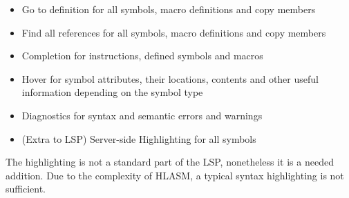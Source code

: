 \begin{itemize}
	\item Go to definition for all symbols, macro definitions and copy members
	\item Find all references for all symbols, macro definitions and copy members
	\item Completion for instructions, defined symbols and macros
	\item Hover for symbol attributes, their locations, contents and other useful information depending on the symbol type
	\item Diagnostics for syntax and semantic errors and warnings
	\item (Extra to LSP) Server-side Highlighting for all symbols  
\end{itemize}

The highlighting is not a standard part of the LSP, nonetheless it is a needed addition. Due to the complexity of HLASM, a typical syntax highlighting is not sufficient.